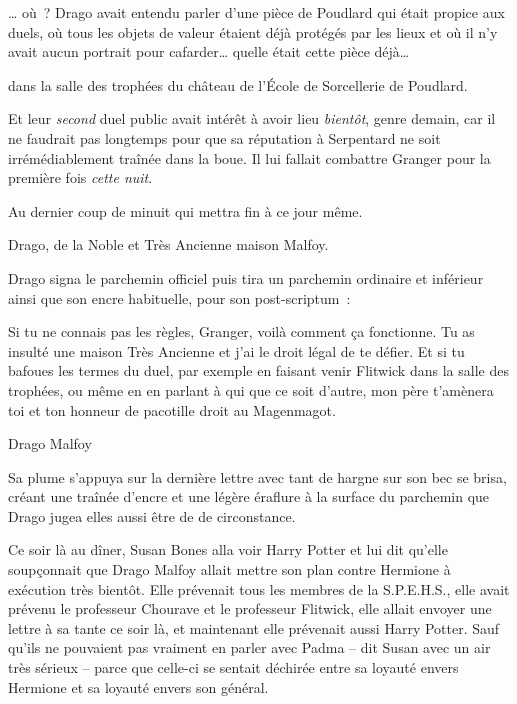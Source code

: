 … où~? Drago avait entendu parler d'une pièce de Poudlard qui était propice aux duels, où tous les objets de valeur étaient déjà protégés par les lieux et où il n'y avait aucun portrait pour cafarder… quelle était cette pièce déjà…

\begin{writtenNote}
dans la salle des trophées du château de l'École de Sorcellerie de Poudlard. \end{writtenNote}

Et leur \emph{second} duel public avait intérêt à avoir lieu \emph{bientôt}, genre demain, car il ne faudrait pas longtemps pour que sa réputation à Serpentard ne soit irrémédiablement traînée dans la boue. Il lui fallait combattre Granger pour la première fois \emph{cette nuit}.

\begin{writtenNote}
Au dernier coup de minuit qui mettra fin à ce jour même.

Drago, de la Noble et Très Ancienne maison Malfoy.
\end{writtenNote}

Drago signa le parchemin officiel puis tira un parchemin ordinaire et inférieur ainsi que son encre habituelle, pour son post-scriptum~:

\begin{writtenNote}Si tu ne connais pas les règles, Granger, voilà comment ça fonctionne. Tu as insulté une maison Très Ancienne et j'ai le droit légal de te défier. Et si tu bafoues les termes du duel, par exemple en faisant venir Flitwick dans la salle des trophées, ou même en en parlant à qui que ce soit d'autre, mon père t'amènera toi et ton honneur de pacotille droit au Magenmagot.

Drago Malfoy
\end{writtenNote}

Sa plume s'appuya sur la dernière lettre avec tant de hargne sur son bec se brisa, créant une traînée d'encre et une légère éraflure à la surface du parchemin que Drago jugea elles aussi être de de circonstance.

\later

Ce soir là au dîner, Susan Bones alla voir Harry Potter et lui dit qu'elle soupçonnait que Drago Malfoy allait mettre son plan contre Hermione à exécution très bientôt. Elle prévenait tous les membres de la S.P.E.H.S., elle avait prévenu le professeur Chourave et le professeur Flitwick, elle allait envoyer une lettre à sa tante ce soir là, et maintenant elle prévenait aussi Harry Potter. Sauf qu'ils ne pouvaient pas vraiment en parler avec Padma -- dit Susan avec un air très sérieux -- parce que celle-ci se sentait déchirée entre sa loyauté envers Hermione et sa loyauté envers son général.

